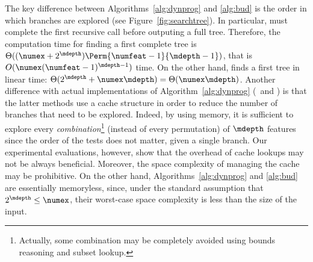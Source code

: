 \documentclass{article}
\begin{document}
			The key difference between Algorithms~\ref{alg:dynprog} and \ref{alg:bud} is the order in which branches are explored (see Figure~\ref{fig:searchtree}). In particular, \dynprog must complete the first recursive call before outputing a full tree. Therefore, the computation time for finding a first complete tree is $\Theta((\numex+2^{\mdepth})\Perm{\numfeat-1}{\mdepth-1})$, that is $O(\numex(\numfeat-1)^{\mdepth-1})$ time. On the other hand, \budalg finds a first tree in linear time: $\Theta(2^{\mdepth}+\numex\mdepth) = \Theta(\numex\mdepth)$.
			Another difference with actual implementations of Algorithm~\ref{alg:dynprog} (\olddleight\ and \dleight) is that the latter methods use a cache structure in order to reduce the number of branches that need to be explored. Indeed, by using memory, it is sufficient to explore every \emph{combination}\footnote{Actually, some combination may be completely avoided using bounds reasoning and subset lookup.} (instead of every permutation) of $\mdepth$ features since the order of the tests does not matter, given a single branch. Our experimental evaluations, however, show that the overhead of cache lookups may not be always beneficial. Moreover, the space complexity of managing the cache may be prohibitive. On the other hand, Algorithms~\ref{alg:dynprog} and \ref{alg:bud} are essentially memoryless, since, under the standard assumption that $2^{\mdepth} \leq \numex$, their worst-case space complexity is less than the size of the input.
			
			
		
			
			
\end{document}
